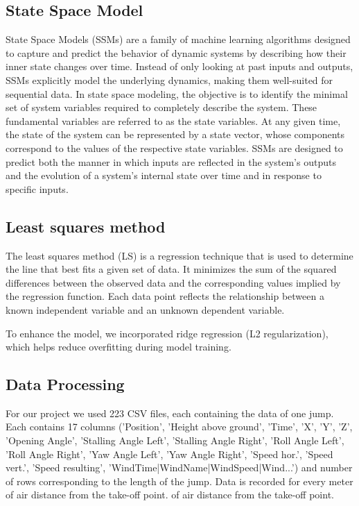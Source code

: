 \documentclass[sigconf,natbib=false, language=english]{acmart}
\begin{document}
\subsection{State Space Model}\label{subsec:ssm}
State Space Models (SSMs) are a family of machine learning algorithms designed to 
capture and predict the behavior of dynamic systems by describing how their inner 
state changes over time. 
Instead of only looking at past inputs and outputs, SSMs explicitly model the 
underlying dynamics, making them well-suited for sequential data. In state space modeling, 
the objective is to identify the minimal set of system variables required to completely 
describe the system. These fundamental variables are referred to as the state variables. 
At any given time, the state of the system can be represented by a state vector, 
whose components correspond to the values of the respective state variables. 
SSMs are designed to predict both the manner in which inputs are reflected in the 
system's outputs and the evolution of a system's internal state over time and in 
response to specific inputs.

\subsection{Least squares method}

The least squares method (LS) is a regression technique that is used to 
determine the line that best fits a given set of data. It minimizes the sum 
of the squared differences between the observed data and the corresponding 
values implied by the regression function. Each data point reflects the relationship 
between a known independent variable and an unknown dependent variable.

To enhance the model, we incorporated ridge regression (L2 regularization), which 
helps reduce overfitting during model training.

\subsection{Data Processing}


For our project we used 223 CSV files, each containing the data of one jump. 
Each contains 17 columns ('Position', 'Height above ground', 'Time', 'X', 'Y', 'Z', 
'Opening Angle', 'Stalling Angle Left', 'Stalling Angle Right', 
'Roll Angle Left', 'Roll Angle Right', 'Yaw Angle Left', 'Yaw Angle Right', 
'Speed hor.', 'Speed vert.', 'Speed resulting', 
'WindTime|WindName|WindSpeed|Wind...')
and number of rows corresponding to the length of the jump. Data is recorded for every meter
of air distance from the take-off point. of air distance from the take-off point.
\end{document}

